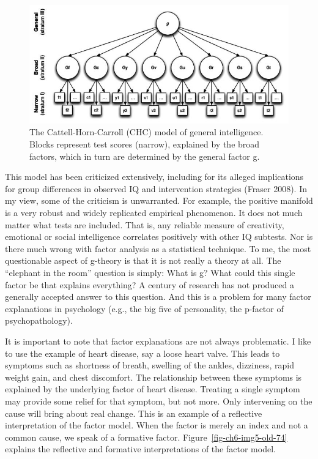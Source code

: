 \documentclass[
  letterpaper,
]{scrbook}
\begin{document}
\begin{figure}

{\centering \includegraphics[width=4.61458in,height=\textheight]{media/ch6/image4.jpg}

}

\caption{\label{fig-ch6-img4-old-73}The Cattell-Horn-Carroll (CHC) model
of general intelligence. Blocks represent test scores (narrow),
explained by the broad factors, which in turn are determined by the
general factor g.}

\end{figure}

This model has been criticized extensively, including for its alleged
implications for group differences in observed IQ and intervention
strategies (Fraser 2008). In my view, some of the criticism is
unwarranted. For example, the positive manifold is a very robust and
widely replicated empirical phenomenon. It does not much matter what
tests are included. That is, any reliable measure of creativity,
emotional or social intelligence correlates positively with other IQ
subtests. Nor is there much wrong with factor analysis as a statistical
technique. To me, the most questionable aspect of g-theory is that it is
not really a theory at all. The ``elephant in the room'' question is
simply: What is g? What could this single factor be that explains
everything? A century of research has not produced a generally accepted
answer to this question. And this is a problem for many factor
explanations in psychology (e.g., the big five of personality, the
p-factor of psychopathology).

It is important to note that factor explanations are not always
problematic. I like to use the example of heart disease, say a loose
heart valve. This leads to symptoms such as shortness of breath,
swelling of the ankles, dizziness, rapid weight gain, and chest
discomfort. The relationship between these symptoms is explained by the
underlying factor of heart disease. Treating a single symptom may
provide some relief for that symptom, but not more. Only intervening on
the cause will bring about real change. This is an example of a
reflective interpretation of the factor model. When the factor is merely
an index and not a common cause, we speak of a formative factor.
Figure~\ref{fig-ch6-img5-old-74} explains the reflective and formative
interpretations of the factor model.
\end{document}
